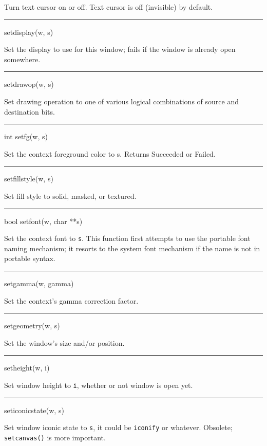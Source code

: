Turn text cursor on or off. Text cursor is off (invisible) by default.


{\sffamily\bfseries
\bigskip\hrule\vspace{0.1cm}
\noindent
setdisplay(w, s)}


Set the display to use for this window; fails if the window is already
open somewhere.


{\sffamily\bfseries
\bigskip\hrule\vspace{0.1cm}
\noindent
setdrawop(w, s)}


Set drawing operation to one of various logical combinations of source
and destination bits.


{\sffamily\bfseries
\bigskip\hrule\vspace{0.1cm}
\noindent
int setfg(w, s)}


Set the context foreground color to s. Returns Succeeded or Failed.


{\sffamily\bfseries
\bigskip\hrule\vspace{0.1cm}
\noindent
setfillstyle(w, s)}


Set fill style to solid, masked, or textured.


{\sffamily\bfseries
\bigskip\hrule\vspace{0.1cm}
\noindent
bool setfont(w, char **s)}


Set the context font to \texttt{s}. This function first attempts to
use the portable font naming mechanism; it resorts to the system font
mechanism if the name is not in portable syntax.


{\sffamily\bfseries
\bigskip\hrule\vspace{0.1cm}
\noindent
setgamma(w, gamma)}


Set the context's gamma correction factor.


{\sffamily\bfseries
\bigskip\hrule\vspace{0.1cm}
\noindent
setgeometry(w, s)}


Set the window's size and/or position.


{\sffamily\bfseries
\bigskip\hrule\vspace{0.1cm}
\noindent
setheight(w, i)}


Set window height to \texttt{i}, whether or not window is open yet.


{\sffamily\bfseries
\bigskip\hrule\vspace{0.1cm}
\noindent
seticonicstate(w, s)}


Set window iconic state to \texttt{s}, it could be
\texttt{{\textquotedbl}iconify{\textquotedbl}} or whatever. Obsolete;
\texttt{setcanvas()} is more important.


